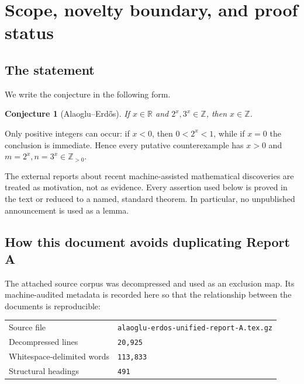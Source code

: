 \documentclass[11pt,oneside]{article}
\newtheorem{conjecture}[theorem]{Conjecture}
\theoremstyle{definition}
\theoremstyle{remark}
\newcommand{\R}{\mathbb{R}}
\newcommand{\Z}{\mathbb{Z}}
\begin{document}
\tableofcontents
\newpage

\section{Scope, novelty boundary, and proof status}

\subsection{The statement}

We write the conjecture in the following form.

\begin{conjecture}[Alaoglu--Erd\H{o}s]\label{conj:AE}
If $x\in\R$ and $2^x,3^x\in\Z$, then $x\in\Z$.
\end{conjecture}

Only positive integers can occur: if $x<0$, then $0<2^x<1$, while if
$x=0$ the conclusion is immediate.  Hence every putative counterexample has
$x>0$ and $m=2^x,n=3^x\in\Z_{>0}$.

The external reports about recent machine-assisted mathematical discoveries
are treated as motivation, not as evidence.  Every assertion used below is
proved in the text or reduced to a named, standard theorem.  In particular,
no unpublished announcement is used as a lemma.

\subsection{How this document avoids duplicating Report A}

The attached source corpus was decompressed and used as an exclusion map.
Its machine-audited metadata is recorded here so that the relationship
between the documents is reproducible:
\begin{center}
\begin{tabular}{@{}ll@{}}
\toprule
Source file & \texttt{alaoglu-erdos-unified-report-A.tex.gz}\\
Decompressed lines & \texttt{20,925}\\
Whitespace-delimited words & \texttt{113,833}\\
Structural headings & \texttt{491}\\
\bottomrule
\end{tabular}
\end{center}
\end{document}
